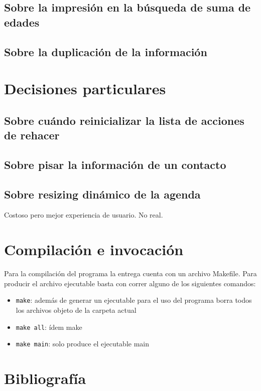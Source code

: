 \documentclass[11pt]{article}
\begin{document}
    \subsection{Sobre la impresi\'on en la b\'usqueda de suma de edades}

    \subsection{Sobre la duplicaci\'on de la informaci\'on}

\section{Decisiones particulares}

    \subsection{Sobre cu\'ando reinicializar la lista de acciones de rehacer}

    \subsection{Sobre pisar la informaci\'on de un contacto}

    \subsection{Sobre resizing din\'amico de la agenda}
    Costoso pero mejor experiencia de usuario. No real. 

\section{Compilaci\'on e invocaci\'on}
Para la compilaci\'on del programa la entrega cuenta con un archivo Makefile. Para producir el archivo ejecutable basta 
con correr alguno de los siguientes comandos: 

\begin{itemize}
    \item \verb|make|: adem\'as de generar un ejecutable para el uso del programa borra todos los archivos objeto de la carpeta actual
    \item \verb|make all|: \'idem make
    \item \verb|make main|: solo produce el ejecutable main
\end{itemize}

\section{Bibliograf\'ia}
\end{document}
